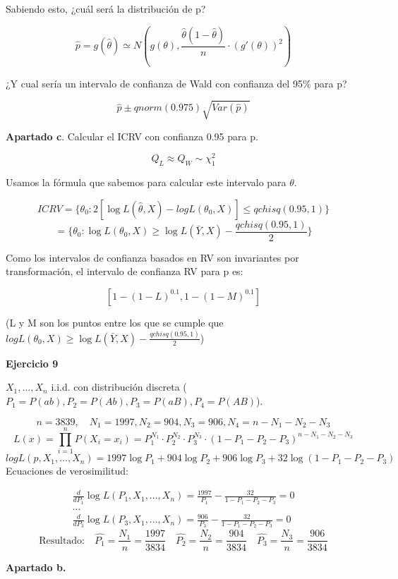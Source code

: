 Sabiendo esto, ¿cuál será la distribución de p?

\[
\widehat{p}=g(\widehat{\theta}) \simeq N(g(\theta),\frac{\widehat{\theta}(1-\widehat{\theta})}{n}\cdot (g'(\theta))^2)
\]

¿Y cual sería un intervalo de confianza de Wald con confianza del 95$\%$ para p?

\[
\widehat{p} \pm qnorm(0.975)\sqrt{Var(\widehat{p})}
\]

\textbf{Apartado c}.
Calcular el ICRV con confianza 0.95 para p.

$$Q_L \approx Q_W \sim \chi^2_1$$

Usamos la fórmula que sabemos para calcular este intervalo para $\theta$.

\[
ICRV=\{ \theta_0:2[\log L(\widehat{\theta},X) - log L(\theta_0,X)] \leq qchisq(0.95,1)\}
\]\[=\{ \theta_0:\log L(\theta_0,X) \geq \log L(\bar{Y},X)-\frac{qchisq(0.95,1)}{2}\}
\]

Como los intervalos de confianza basados en RV son invariantes por transformación, el intervalo de confianza RV para p es:

\[
[1-(1-L)^{0.1},1-(1-M)^{0.1}]
\]

(L y M son los puntos entre los que se cumple que $log L(\theta_0,X) \geq \log L(\bar{Y},X)-\frac{qchisq(0.95,1)}{2}$)

\textbf{Ejercicio 9}

$X_1,\dots,X_n$ i.i.d. con distribución discreta ($P_1=P(ab),P_2=P(Ab),P_3=P(aB),P_4=P(AB)$).

\[
n=3839, \quad N_1=1997,N_2=904, N_3=906, N_4=n-N_1-N_2-N_3
\]
\[
L(x)=\prod_{i=1}^{n}P(X_i=x_i)=P_1^{N_1}\cdot P_2^{N_2}\cdot P_3^{N_3}\cdot (1-P_1-P_2-P_3)^{n-N_1-N_2-N_3}
\]
\[
log L(p,X_1,\dots,X_n)=1997 \log P_1+ 904 \log P_2+906 \log P_3+32\log(1-P_1-P_2-P_3)
\]
\newpage
Ecuaciones de verosimilitud:

\[
\begin{matrix}
    \frac{d}{d P_1} \log L(P_1, X_1, \dots, X_n) = \frac{1997}{P_1} - \frac{32}{1 - P_1 - P_2 - P_3} = 0 \\[1em]
    \dots \\[1em]
    \frac{d}{d P_3} \log L(P_3, X_1, \dots, X_n) = \frac{906}{P_3} - \frac{32}{1 - P_1 - P_2 - P_3} = 0
\end{matrix}
\]
\[
    \text{Resultado:}\quad \widehat{P_1}=\frac{N_1}{n}=\frac{1997}{3834} \quad \widehat{P_2}=\frac{N_2}{n}=\frac{904}{3834} \quad \widehat{P_3}=\frac{N_3}{n}=\frac{906}{3834}
\]

\textbf{Apartado b.}

